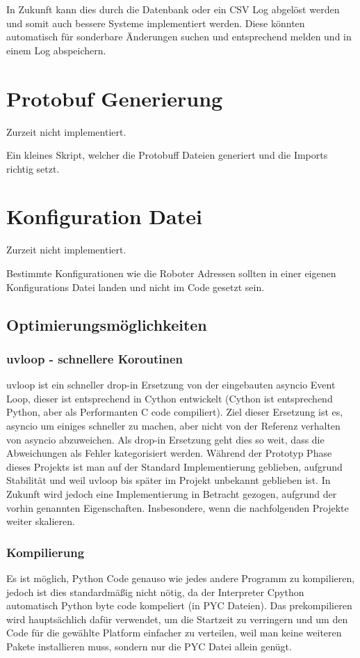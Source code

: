 In Zukunft kann dies durch die Datenbank oder ein CSV Log abgelöst werden 
und somit auch bessere Systeme implementiert werden.
% 
Diese könnten automatisch für sonderbare Änderungen suchen 
und entsprechend melden und in einem Log abspeichern.

\section{Protobuf Generierung}
Zurzeit nicht implementiert.

Ein kleines Skript, welcher die Protobuff Dateien generiert
und die Imports richtig setzt. 

\section{Konfiguration Datei}
Zurzeit nicht implementiert.

Bestimmte Konfigurationen wie die Roboter Adressen 
sollten in einer eigenen Konfigurations Datei landen und nicht im Code gesetzt sein.


\subsection{Optimierungsmöglichkeiten}
\label{subsec:Optimierungsmöglichkeiten}
\subsubsection{uvloop - schnellere Koroutinen}
uvloop ist ein schneller drop-in Ersetzung von der eingebauten asyncio Event Loop, 
dieser ist entsprechend in Cython entwickelt 
(Cython ist entsprechend Python, aber als Performanten C code compiliert).
Ziel dieser Ersetzung ist es, asyncio um einiges schneller zu machen, 
aber nicht von der Referenz verhalten von asyncio abzuweichen. 
Als drop-in Ersetzung geht dies so weit, 
dass die Abweichungen als Fehler kategorisiert werden.
% 
Während der Prototyp Phase dieses Projekts 
ist man auf der Standard Implementierung geblieben, aufgrund Stabilität
und weil uvloop bis später im Projekt unbekannt geblieben ist.
In Zukunft wird jedoch eine Implementierung in Betracht gezogen,
aufgrund der vorhin genannten Eigenschaften.
% 
Insbesondere, wenn die nachfolgenden Projekte weiter skalieren.

\subsubsection{Kompilierung}
Es ist möglich, Python Code genauso wie jedes andere Programm zu kompilieren,
jedoch ist dies standardmäßig nicht nötig, 
da der Interpreter Cpython automatisch Python byte code kompeliert (in PYC Dateien).
Das prekompilieren wird hauptsächlich dafür verwendet, 
um die Startzeit zu verringern 
und um den Code für die gewählte Platform einfacher zu verteilen,
weil man keine weiteren Pakete installieren muss, 
sondern nur die PYC Datei allein genügt.

